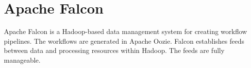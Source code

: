 \section{Apache Falcon}

Apache Falcon \cite{hid-sp18-www-526-apache-falcon} is
a Hadoop-based data management system for creating
workflow pipelines. The workflows are generated in Apache
Oozie. Falcon establishes feeds between data and processing
resources within Hadoop. The feeds are fully manageable.
